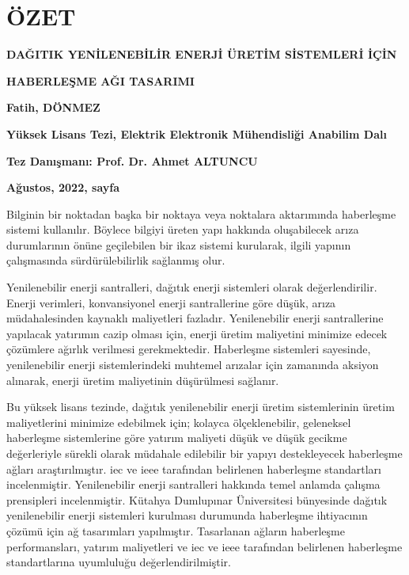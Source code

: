 

\chapter*{\vspace{2 cm}\hfill{\centering ÖZET}\hfill}
\singlespacing



\centerline{\textbf {DAĞITIK YENİLENEBİLİR ENERJİ ÜRETİM SİSTEMLERİ İÇİN}}
\centerline{\textbf {HABERLEŞME AĞI TASARIMI}}

\vspace{.5 cm}
\centerline{\textbf {Fatih, DÖNMEZ}}
\centerline{\textbf {Yüksek Lisans Tezi, Elektrik Elektronik Mühendisliği Anabilim Dalı}}
\centerline{\textbf {Tez Danışmanı: Prof. Dr. Ahmet ALTUNCU}}
\centerline{\textbf {Ağustos, 2022, \pageref{LastPage} sayfa}}

\vspace{.5 cm}
\onehalfspacing


Bilginin bir noktadan başka bir noktaya veya noktalara aktarımında haberleşme sistemi kullanılır. Böylece bilgiyi üreten yapı hakkında oluşabilecek arıza durumlarının önüne geçilebilen bir ikaz sistemi kurularak, ilgili yapının çalışmasında sürdürülebilirlik sağlanmış olur.

Yenilenebilir enerji santralleri, dağıtık enerji sistemleri olarak değerlendirilir. Enerji verimleri, konvansiyonel enerji santrallerine göre düşük, arıza müdahalesinden kaynaklı maliyetleri fazladır. Yenilenebilir enerji santrallerine yapılacak yatırımın cazip olması için, enerji üretim maliyetini minimize edecek çözümlere ağırlık verilmesi gerekmektedir. Haberleşme sistemleri sayesinde, yenilenebilir enerji sistemlerindeki muhtemel arızalar için zamanında aksiyon alınarak, enerji üretim maliyetinin düşürülmesi sağlanır. 


Bu yüksek lisans tezinde, dağıtık yenilenebilir enerji üretim sistemlerinin üretim maliyetlerini minimize edebilmek için; kolayca ölçeklenebilir, geleneksel haberleşme sistemlerine göre yatırım maliyeti düşük ve düşük gecikme değerleriyle sürekli olarak müdahale edilebilir bir yapıyı destekleyecek haberleşme ağları araştırılmıştır. \gls{iec} ve \gls{ieee} tarafından belirlenen haberleşme standartları incelenmiştir. Yenilenebilir enerji santralleri hakkında temel anlamda çalışma prensipleri incelenmiştir. Kütahya Dumlupınar Üniversitesi bünyesinde dağıtık yenilenebilir enerji sistemleri kurulması durumunda haberleşme ihtiyacının çözümü için ağ tasarımları yapılmıştır. Tasarlanan ağların haberleşme performansları, yatırım maliyetleri ve \gls{iec} ve \gls{ieee} tarafından belirlenen haberleşme standartlarına uyumluluğu değerlendirilmiştir. 


